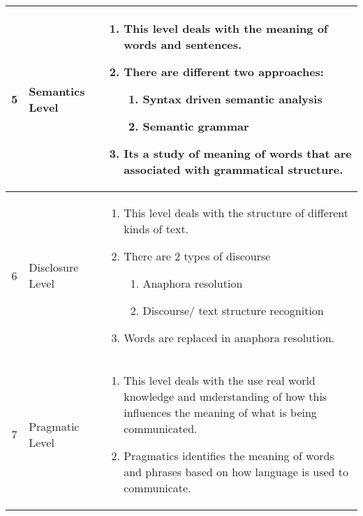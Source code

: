\begin{longtable}{|c|m{2.7cm}|m{10cm}|}
    5 & Semantics Level & \begin{enumerate}
        \item This level deals with the meaning of words and sentences.
        \item There are different two approaches:
        \begin{enumerate}
            \item Syntax driven semantic analysis
            \item Semantic grammar
        \end{enumerate} 
        \item Its a study of meaning of words that are associated with grammatical structure.
    \end{enumerate} \\ \hline

    6 & Disclosure Level & \begin{enumerate}
        \item This level deals with the structure of different kinds of text.
        \item There are 2 types of discourse
        \begin{enumerate}
            \item Anaphora resolution
            \item Discourse/ text structure recognition
        \end{enumerate}
        \item Words are replaced in anaphora resolution.
    \end{enumerate} \\ \hline

    7 & Pragmatic Level & \begin{enumerate}
        \item This level deals with the use real world knowledge and understanding of how this influences the meaning of what is being communicated.
        \item Pragmatics identifies the meaning of words and phrases based on how language is used to communicate.
    \end{enumerate}

\end{longtable}
































